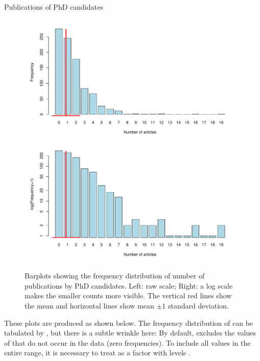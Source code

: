 \documentclass[11pt]{book}\usepackage[]{graphicx}\usepackage[]{color}
\begin{document}
\begin{Example}[phdpubs1]{Publications of PhD candidates}
\begin{figure}[htb]
  \centering
  \includegraphics[width=.49\textwidth]{ch09/fig/phdpubs-barplot1}
  \includegraphics[width=.49\textwidth]{ch09/fig/phdpubs-barplot2}
  \caption{Barplots showing the frequency distribution of number of publications by PhD candidates.
  Left: raw scale; Right: a log scale makes the smaller counts more visible. The vertical red
  lines show the mean and horizontal lines show mean $\pm 1$  standard deviation.}
  \label{fig:phdpubs-barplot}
\end{figure}

These plots are produced as shown below.  The frequency distribution of
 can be tabulated by , but there is a subtle
wrinkle here:  By default,  excludes the values of 
that do not occur in the data (zero frequencies).  To include all values in
the entire range, it is necessary to treat  as a factor
with levels .


\end{Example}
\end{document}
